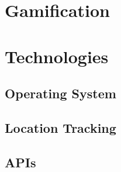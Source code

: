 

\section{Gamification}



\section{Technologies}
%
\subsection{Operating System}
%
%
%

\subsection{Location Tracking}


\subsection{APIs}
